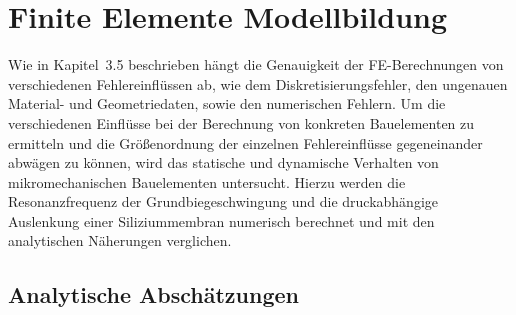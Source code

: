 \section{Finite Elemente Modellbildung}
\label{femodellbildung}

Wie in Kapitel~3.5 beschrieben hängt die Genauigkeit der FE-Berechnungen
von verschiedenen Fehlereinflüssen ab, wie dem Diskretisierungsfehler,
den ungenauen Material- und Geometriedaten, sowie den numerischen Fehlern.
Um die verschiedenen Einflüsse bei der Berechnung von konkreten Bauelementen
zu ermitteln und die Größenordnung der einzelnen Fehlereinflüsse
gegeneinander abwägen zu können, wird das statische und dynamische
Verhalten von mikromechanischen Bauelementen untersucht. Hierzu werden die
Resonanzfrequenz der Grundbiegeschwingung und die druckabhängige Auslenkung
einer Siliziummembran numerisch berechnet und mit den analytischen Näherungen
verglichen.


\subsection{Analytische Abschätzungen}
\label{abschaetzungen}

